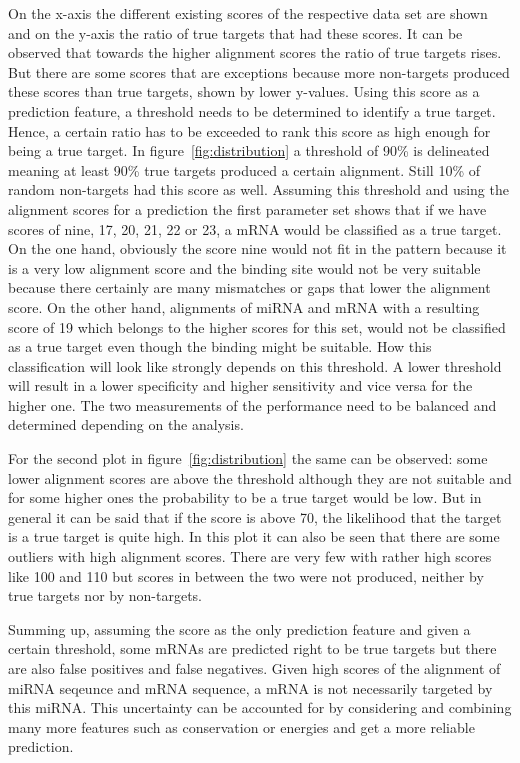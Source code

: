 \documentclass[12pt]{article}
\begin{document}
On the x-axis the different existing scores of the respective data set are shown and on the y-axis the ratio of true targets that had these scores. It can be observed that towards the higher alignment scores the ratio of true targets rises. But there are some scores that are exceptions because more non-targets produced these scores than true targets, shown by lower y-values. Using this score as a prediction feature, a threshold needs to be determined to identify a true target. Hence, a certain ratio has to be exceeded to rank this score as high enough for being a true target. In figure~\ref{fig:distribution} a threshold of 90\% is delineated meaning at least 90\% true targets produced a certain alignment. Still 10\% of random non-targets had this score as well. Assuming this threshold and using the alignment scores for a prediction the first parameter set shows that if we have scores of nine, 17, 20, 21, 22 or 23, a mRNA would be classified as a true target. On the one hand, obviously the score nine would not fit in the pattern because it is a very low alignment score and the binding site would not be very suitable because there certainly are many mismatches or gaps that lower the alignment score. On the other hand, alignments of miRNA and mRNA with a resulting score of 19 which belongs to the higher scores for this set, would not be classified as a true target even though the binding might be suitable. How this classification will look like strongly depends on this threshold. A lower threshold will result in a lower specificity and higher sensitivity and vice versa for the higher one. The two measurements of the performance need to be balanced and determined depending on the analysis.

For the second plot in figure~\ref{fig:distribution} the same can be observed: some lower alignment scores are above the threshold although they are not suitable and for some higher ones the probability to be a true target would be low. But in general it can be said that if the score is above 70, the likelihood that the target is a true target is quite high. In this plot it can also be seen that there are some outliers with high alignment scores. There are very few with rather high scores like 100 and 110 but scores in between the two were not produced, neither by true targets nor by non-targets.  

Summing up, assuming the score as the only prediction feature and given a certain threshold, some mRNAs are predicted right to be true targets but there are also false positives and false negatives. Given high scores of the alignment of miRNA seqeunce and mRNA sequence, a mRNA is not necessarily targeted by this miRNA. This uncertainty can be accounted for by considering and combining many more features such as conservation or energies and get a more reliable prediction.\\
\end{document}
